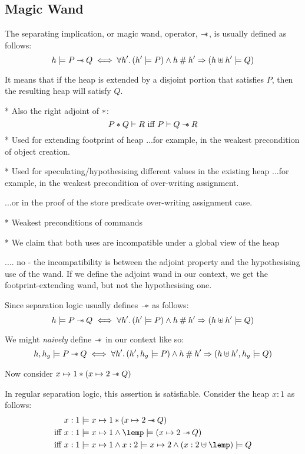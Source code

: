 \documentclass[a4paper,notitlepage]{report}
\begin{document}
\subsection{Magic Wand}
\label{sec:wand}
The separating implication, or magic wand, operator, $\mathbin{-\mkern-6mu *}$, is usually defined
as follows:
\[
  h \models P \mathbin{-\mkern-6mu *} Q \iff \forall h' \mathpunct{.} (h' \models P) \land h \mathbin{\#}
    h' \Rightarrow (h \uplus h' \models Q)
\]

It means that if the heap is extended by a disjoint portion that satisfies $P$,
then the resulting heap will satisfy $Q$.

* Also the right adjoint of $\mathbin{*}$:
\newcommand{\entails}{\vdash}
\[
P \sep Q \entails R \text{ iff } P \entails Q \wand R
\]
* Used for extending footprint of heap
    ...for example, in the weakest precondition of object creation.

* Used for speculating/hypothesising different values in the existing heap
    ...for example, in the weakest precondition of over-writing assignment.

    ...or in the proof of the store predicate over-writing assignment case.

* Weakest preconditions of commands

* We claim that both uses are incompatible under a global view of the heap

    .... no - the incompatibility is between the adjoint property and the
    hypothesising use of the wand. If we define the adjoint wand in our context,
    we get the footprint-extending wand, but not the hypothesising one.

Since separation logic usually defines  $\mathbin{-\mkern-6mu *}$
as follows:
\[
  h \models P \mathbin{-\mkern-6mu *} Q \iff \forall h' \mathpunct{.} (h' \models P) \land h \mathbin{\#}
    h' \Rightarrow (h \uplus h' \models Q)
\]

We might \emph{naively} define $\mathbin{-\mkern-6mu *}$ in our context like so:
\[
  h,h_g \models P \mathbin{-\mkern-6mu *} Q \iff \forall h' \mathpunct{.} (h',h_g \models P) \land h \mathbin{\#}
    h' \Rightarrow (h \uplus h',h_g \models Q)
\]

Now consider $x \mapsto 1 \mathbin{*} (x \mapsto 2 \mathbin{-\mkern-6mu *} Q)$

 In regular separation logic, this assertion is satisfiable. Consider the heap
 $x:1$ as follows:
\begin{align*}
           & x:1 \satisfies x \pointsto 1 \sep (x \pointsto 2 \wand Q) \\
\text{iff } & x:1 \satisfies x \pointsto 1 \land \lemp \satisfies (x \pointsto 2 \wand Q) \\
\text{iff } & x:1 \satisfies x \pointsto 1 \land x:2 \satisfies x \pointsto 2 \land (x:2 \disju \lemp) \satisfies Q
\end{align*}
\end{document}

